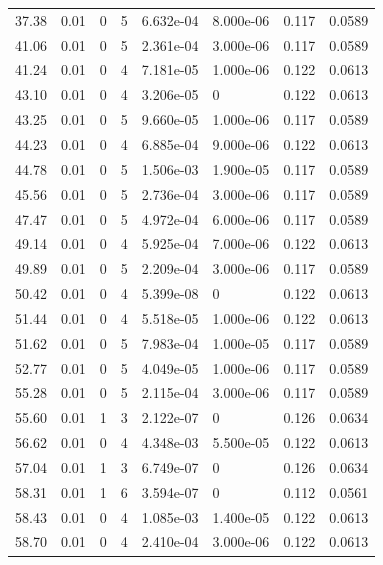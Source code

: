\documentclass[preview]{standalone}
\begin{document}
{{{\begin{tabular}{L{1.2cm}C{1.2cm} C{0.3cm}C{0.5cm} C{1.4cm}C{1.4cm} C{1.4cm}C{1.4cm}}
  37.38  &  0.01  & 0     &  5 &  6.632e-04  & 8.000e-06  & 0.117 &  0.0589   \\ 
  41.06  &  0.01  & 0     &  5 &  2.361e-04  & 3.000e-06  & 0.117 &  0.0589   \\ 
  41.24  &  0.01  & 0     &  4 &  7.181e-05  & 1.000e-06  & 0.122 &  0.0613   \\ 
  43.10  &  0.01  & 0     &  4 &  3.206e-05  & 0  & 0.122 &  0.0613   \\ 
  43.25  &  0.01  & 0     &  5 &  9.660e-05  & 1.000e-06  & 0.117 &  0.0589   \\ 
  44.23  &  0.01  & 0     &  4 &  6.885e-04  & 9.000e-06  & 0.122 &  0.0613   \\ 
  44.78  &  0.01  & 0     &  5 &  1.506e-03  & 1.900e-05  & 0.117 &  0.0589   \\ 
  45.56  &  0.01  & 0     &  5 &  2.736e-04  & 3.000e-06  & 0.117 &  0.0589   \\ 
  47.47  &  0.01  & 0     &  5 &  4.972e-04  & 6.000e-06  & 0.117 &  0.0589   \\ 
  49.14  &  0.01  & 0     &  4 &  5.925e-04  & 7.000e-06  & 0.122 &  0.0613   \\ 
  49.89  &  0.01  & 0     &  5 &  2.209e-04  & 3.000e-06  & 0.117 &  0.0589   \\ 
  50.42  &  0.01  & 0     &  4 &  5.399e-08  & 0  & 0.122 &  0.0613   \\ 
  51.44  &  0.01  & 0     &  4 &  5.518e-05  & 1.000e-06  & 0.122 &  0.0613   \\ 
  51.62  &  0.01  & 0     &  5 &  7.983e-04  & 1.000e-05  & 0.117 &  0.0589   \\ 
  52.77  &  0.01  & 0     &  5 &  4.049e-05  & 1.000e-06  & 0.117 &  0.0589   \\ 
  55.28  &  0.01  & 0     &  5 &  2.115e-04  & 3.000e-06  & 0.117 &  0.0589   \\ 
  55.60  &  0.01  & 1     &  3 &  2.122e-07  & 0  & 0.126 &  0.0634   \\ 
  56.62  &  0.01  & 0     &  4 &  4.348e-03  & 5.500e-05  & 0.122 &  0.0613   \\ 
  57.04  &  0.01  & 1     &  3 &  6.749e-07  & 0  & 0.126 &  0.0634   \\ 
  58.31  &  0.01  & 1     &  6 &  3.594e-07  & 0  & 0.112 &  0.0561   \\ 
  58.43  &  0.01  & 0     &  4 &  1.085e-03  & 1.400e-05  & 0.122 &  0.0613   \\ 
  58.70  &  0.01  & 0     &  4 &  2.410e-04  & 3.000e-06  & 0.122 &  0.0613   \\ 

\end{tabular}}}}
\end{document}
